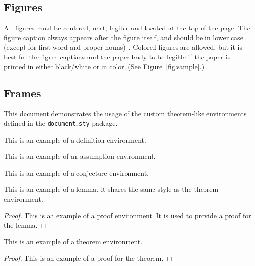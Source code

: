 

\subsection{Figures}

All figures must be centered, neat, legible and located at the top of the page. 
The figure caption always appears after the figure itself, and should be in lower case (except for first word and proper nouns)~\autocite{neurips2023template}. 
Colored figures are allowed, but it is best for the figure captions and the paper body to be legible if the paper is printed in either black/white or in color.
(See Figure~\ref{fig:sample}.)

\subsection{Frames}

This document demonstrates the usage of the custom theorem-like environments defined in the \texttt{document.sty} package.

\begin{definition}
  This is an example of a definition environment.
\end{definition}

\begin{assumption}
  This is an example of an assumption environment.
\end{assumption}

\begin{conjecture}
  This is an example of a conjecture environment.
\end{conjecture}

\begin{lemma}
  This is an example of a lemma. It shares the same style as the theorem environment.
\end{lemma}
\begin{proof}
  This is an example of a proof environment. It is used to provide a proof for the lemma.
\end{proof}

\begin{theorem}
  This is an example of a theorem environment. 
\end{theorem}
\begin{proof}
  This is an example of a proof for the theorem.
\end{proof}

